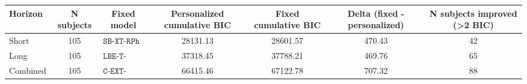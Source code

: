 \begin{tabular}{lcccccc}
\toprule
Horizon & N subjects & Fixed model & Personalized cumulative BIC & Fixed cumulative BIC & Delta (fixed - personalized) & N subjects improved (>2 BIC) \\
\midrule
Short & 105 & $\texttt{SB-XT-RPh----}$ & 28131.13 & 28601.57 & 470.43 & 42 \\
Long & 105 & $\texttt{LBE-T-RPhCL--}$ & 37318.45 & 37788.21 & 469.76 & 65 \\
Combined & 105 & $\texttt{C-EXT-RPHC-UK}$ & 66415.46 & 67122.78 & 707.32 & 88 \\
\bottomrule
\end{tabular}
